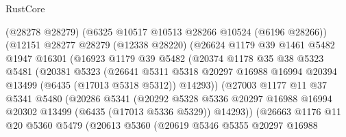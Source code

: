\begin{lexlean}{RustCore}
\begin{coremodule}
                      (@28278 @28279)
                      (@6325 @10517 @10513 @28266 @10524 (@6196 @28266))
                      (@12151
                        @28277
                        @28279
                        (@12338 @28220)
                        (@26624
                          @1179
                          @39
                          @1461
                          @5482
                          @1947
                          @16301
                          (@16923
                            @1179
                            @39
                            @5482
                            (@20374
                              @1178
                              @35
                              @38
                              @5323
                              @5481
                              (@20381
                                @5323
                                (@26641
                                  @5311
                                  @5318
                                  @20297
                                  @16988
                                  @16994
                                  @20394
                                  @13499
                                  (@6435 (@17013 @5318 @5312))
                                  @14293))
                              (@27003
                                @1177
                                @11
                                @37
                                @5341
                                @5480
                                (@20286
                                  @5341
                                  (@20292
                                    @5328
                                    @5336
                                    @20297
                                    @16988
                                    @16994
                                    @20302
                                    @13499
                                    (@6435 (@17013 @5336 @5329))
                                    @14293))
                                (@26663
                                  @1176
                                  @11
                                  @20
                                  @5360
                                  @5479
                                  (@20613
                                    @5360
                                    (@20619
                                      @5346
                                      @5355
                                      @20297
                                      @16988

\end{coremodule}
\end{lexlean}
